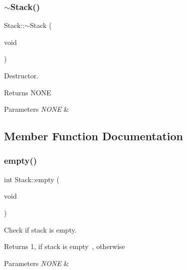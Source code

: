 \subsubsection{\texorpdfstring{$\sim$\+Stack()}{~Stack()}}
{\footnotesize\ttfamily Stack\+::$\sim$\+Stack (\begin{DoxyParamCaption}\item[{void}]{ }\end{DoxyParamCaption})}



Destructor. 

\begin{DoxyReturn}{Returns}
N\+O\+NE
\end{DoxyReturn}

\begin{DoxyParams}{Parameters}
{\em N\+O\+NE} & \\
\hline
\end{DoxyParams}


\subsection{Member Function Documentation}
\mbox{\label{classStack_ae340b80cf90a09d5fd6e14efe73f1166}} 
\subsubsection{\texorpdfstring{empty()}{empty()}}
{\footnotesize\ttfamily int Stack\+::empty (\begin{DoxyParamCaption}\item[{void}]{ }\end{DoxyParamCaption})}



Check if stack is empty. 

\begin{DoxyReturn}{Returns}
1, if stack is empty~, otherwise
\end{DoxyReturn}

\begin{DoxyParams}{Parameters}
{\em N\+O\+NE} & \\
\hline
\end{DoxyParams}
\mbox{\label{classStack_a30424a3106b7c53dced7c630e35308d6}} 
